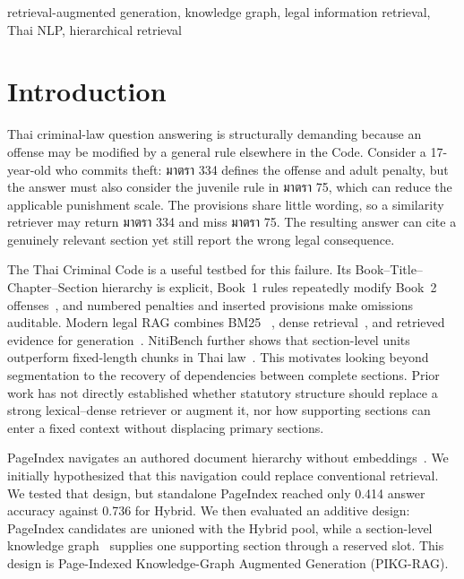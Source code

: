 \documentclass[conference]{IEEEtran}
\providecommand{\TH}{}\renewcommand{\TH}[1]{{\thaifont #1}}
\begin{document}
\begin{IEEEkeywords}
retrieval-augmented generation, knowledge graph, legal information retrieval, Thai NLP,
hierarchical retrieval
\end{IEEEkeywords}

\section{Introduction}

Thai criminal-law question answering is structurally demanding because an offense may be modified
by a general rule elsewhere in the Code. Consider a 17-year-old who commits theft: \TH{มาตรา} 334
defines the offense and adult penalty, but the answer must also consider the juvenile rule in
\TH{มาตรา} 75, which can reduce the applicable punishment scale. The provisions share little
wording, so a similarity retriever may return \TH{มาตรา} 334 and miss \TH{มาตรา} 75. The resulting
answer can cite a genuinely relevant section yet still report the wrong legal consequence.

The Thai Criminal Code is a useful testbed for this failure. Its Book--Title--Chapter--Section
hierarchy is explicit, Book~1 rules repeatedly modify Book~2 offenses~\cite{pythainlpthailaw}, and numbered penalties and
inserted provisions make omissions auditable. Modern legal RAG combines BM25
~\cite{robertson2009bm25}, dense retrieval~\cite{karpukhin2020dpr}, and retrieved evidence for
generation~\cite{lewis2020rag}. NitiBench further shows that section-level units outperform
fixed-length chunks in Thai law~\cite{akarajaradwong2025nitibench}. This motivates looking beyond
segmentation to the recovery of dependencies between complete sections.
Prior work has not directly established whether statutory structure should replace a strong
lexical--dense retriever or augment it, nor how supporting sections can enter a fixed context without
displacing primary sections.

PageIndex navigates an authored document hierarchy without embeddings~\cite{pageindex}. We initially
hypothesized that this navigation could replace conventional retrieval. We tested that design, but
standalone PageIndex reached only
0.414 answer accuracy against 0.736 for Hybrid. We then evaluated an additive design: PageIndex
candidates are unioned with the Hybrid pool, while a section-level knowledge
graph~\cite{edge2024graphrag,pan2024unifying} supplies one supporting section through a reserved
slot. This design is Page-Indexed Knowledge-Graph Augmented Generation (PIKG-RAG).
\end{document}
